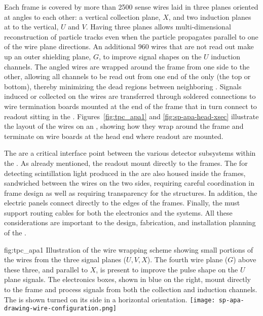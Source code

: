 Each  frame is covered by more than \num{2500} sense wires laid in three planes  oriented at angles to each other: a vertical collection plane, $X$, and two induction planes at \apainducwireangle to the vertical, $U$ and $V$. Having three planes allows multi-dimensional reconstruction of particle tracks even when the particle propagates parallel to one of the wire plane directions.  An additional \num{960} wires that are not read out make up an outer shielding plane, $G$, to improve signal shapes on the $U$ induction channels.  The angled wires are wrapped around the frame from one side to the other, allowing all channels to be read out from one end of the  only (the top or bottom), thereby minimizing the dead regions between neighboring . Signals induced or collected on the wires are transferred through soldered connections to wire termination boards mounted at the end of the  frame that in turn connect to  readout  sitting in the .  Figures~\ref{fig:tpc_apa1} and \ref{fig:sp-apa-head-xsec} illustrate the layout of the wires on an , showing how they wrap around the frame and terminate on wire boards at the head end where readout  are mounted.

The  are a critical interface point between the various detector subsystems within the .  As already mentioned, the  readout  mount directly to the  frames.  The  for detecting scintillation light produced in the  are also housed inside the frames, sandwiched between the wires on the two sides, requiring careful coordination in frame design as well as requiring transparency for the  structures.  In addition, the electric  panels connect directly to the edges of the  frames.  Finally, the  must support routing cables for both the  electronics and the  systems. All these considerations are important to the design, fabrication, and installation planning of the .

\begin{dunefigure}{fig:tpc_apa1}
{Illustration of the   wire wrapping scheme showing small portions of the wires from the three signal planes ($U,V,X$). The fourth wire plane ($G$) above these three, and parallel to $X$, is present to improve the pulse shape on the $U$ plane signals. The  electronics boxes, shown in blue on the right, mount directly to the frame and process signals from both the collection and induction channels. The  is shown turned on its side in a horizontal orientation.} 
\texttt{[image: sp-apa-drawing-wire-configuration.png]} 
\end{dunefigure} 


